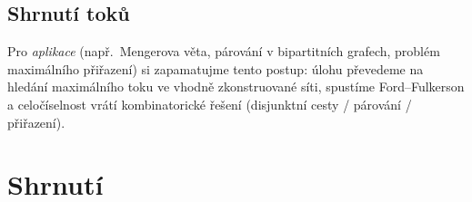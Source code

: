 \documentclass[11pt,a4paper]{article}
\begin{document}
\subsection{Shrnutí toků}

Pro \emph{aplikace} (např.\ Mengerova věta, párování v bipartitních grafech, problém maximálního přiřazení) si zapamatujme tento postup: úlohu převedeme na hledání maximálního toku ve vhodně zkonstruované síti, spustíme Ford--Fulkerson a celočíselnost vrátí kombinatorické řešení (disjunktní cesty / párování / přiřazení).

\section*{Shrnutí}
\end{document}

